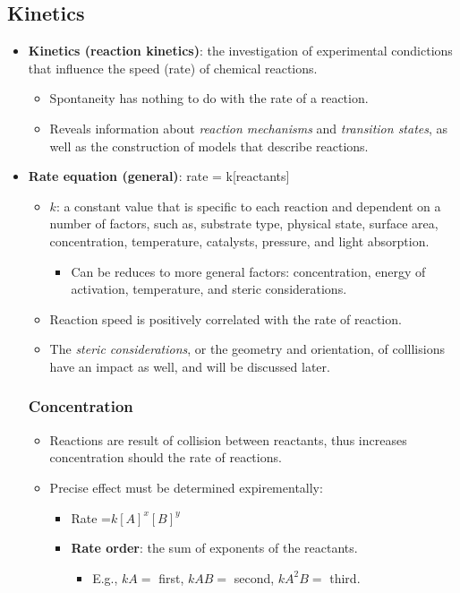 \documentclass[12pt,a4paper]{article}
\begin{document}
\subsection{Kinetics}
\begin{itemize}
    \item \textbf{Kinetics (reaction kinetics)}: the investigation of experimental condictions that influence the {\color{o-Sun}speed (rate)} of chemical reactions.
        \begin{itemize}
            \item Spontaneity has nothing to do with the rate of a reaction.
            \item Reveals information about \textit{reaction mechanisms} and \textit{transition states}, as well as the construction of models that describe reactions.
        \end{itemize}
    \item \textbf{Rate equation (general)}: rate = k[reactants]
        \begin{itemize}
            \item \(k\): a constant value that is specific to each reaction and dependent on a number of factors, such as, substrate type, physical state, surface area, concentration, temperature, catalysts, pressure, and light absorption. 
                \begin{itemize}
                    \item Can be reduces to more general factors: {\color{o-Sun}concentration}, {\color{o-Sun}energy of activation}, {\color{o-Sun}temperature}, and {\color{o-Sun}steric considerations}.
                \end{itemize}
            \item Reaction speed is positively correlated with the rate of reaction.
            \item The \textit{steric considerations}, or the geometry and orientation, of colllisions have an impact as well, and will be discussed later.
        \end{itemize}
    \subsubsection{Concentration}
    \begin{itemize}
        \item Reactions are result of collision between reactants, thus increases concentration should the rate of reactions.
        \item Precise effect must be determined expirementally:
            \begin{itemize}
                \item Rate =\(k[A]^x[B]^y\)
                \item \textbf{Rate order}: the sum of exponents of the reactants.
                    \begin{itemize}
                        \item E.g., \(kA=\) first, \(kAB=\) second, \(kA^2B=\) third.
                    \end{itemize}
            \end{itemize}
    \end{itemize}

\end{itemize}
\end{document}
